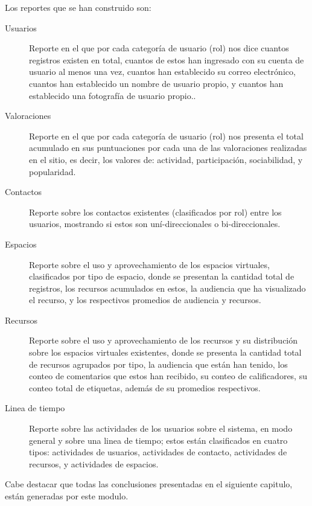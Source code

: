 Los reportes que se han construido son:

\begin{description}
\item [Usuarios] Reporte en el que por cada categoría de usuario (rol) nos dice
cuantos registros existen en total, cuantos de estos han ingresado con su cuenta
de usuario al menos una vez, cuantos han establecido su correo electrónico,
cuantos han establecido un nombre de usuario propio, y cuantos han establecido
una fotografía de usuario propio..
\item [Valoraciones] Reporte en el que por cada categoría de usuario (rol) nos
presenta el total acumulado en sus puntuaciones por cada una de las valoraciones
realizadas en el sitio, es decir, los valores de: actividad, participación,
sociabilidad, y popularidad.
\item [Contactos] Reporte sobre los contactos existentes (clasificados por rol)
entre los usuarios, mostrando si estos son uní-direccionales o
bi-direccionales.
\item [Espacios] Reporte sobre el uso y aprovechamiento de los espacios
virtuales, clasificados por tipo de espacio, donde se presentan la cantidad
total de registros, los recursos acumulados en estos, la audiencia que ha
visualizado el recurso, y los respectivos promedios de audiencia y recursos.
\item [Recursos] Reporte sobre el uso y aprovechamiento de los recursos y su
distribución sobre los espacios virtuales existentes, donde se presenta la
cantidad total de recursos agrupados por tipo, la audiencia que están han
tenido, los conteo de comentarios que estos han recibido, su conteo de
calificadores, su conteo total de etiquetas, además de su promedios respectivos.
\item [Linea de tiempo] Reporte sobre las actividades de los usuarios sobre el
sistema, en modo general y sobre una linea de tiempo; estos están clasificados
en cuatro tipos: actividades de usuarios, actividades de contacto, actividades
de recursos, y actividades de espacios.
\end{description}

Cabe destacar que todas las conclusiones presentadas en el siguiente capitulo,
están generadas por este modulo.

